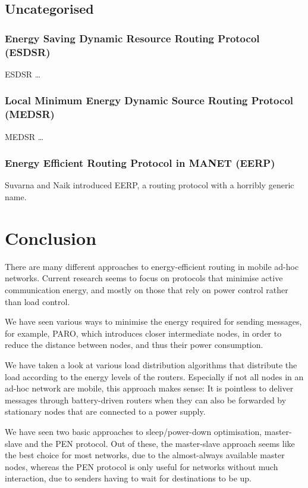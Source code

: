 \documentclass[conference]{IEEEtran}
\begin{document}
\subsection{Uncategorised}

\subsubsection{Energy Saving Dynamic Resource Routing Protocol (ESDSR)}
ESDSR\cite{tarique2005energy} \ldots{}

\subsubsection{Local Minimum Energy Dynamic Source Routing Protocol (MEDSR)}
MEDSR\cite{tanque2007minimum} \ldots{}

\subsubsection{Energy Efficient Routing Protocol in MANET (EERP)}
Suvarna and Naik introduced EERP, a routing protocol with a horribly
generic name\cite{main2}.

\section{Conclusion}
There are many different approaches to energy-efficient routing in
mobile ad-hoc networks. Current research seems to focus on protocols
that minimise active communication energy, and mostly on those that
rely on power control rather than load control.

We have seen various ways to minimise the energy required for sending
messages, for example, PARO, which introduces closer intermediate nodes,
in order to reduce the distance between nodes, and thus their
power consumption.

We have taken a look at various load distribution algorithms that distribute
the load according to the energy levels of the routers. Especially if not all
nodes in an ad-hoc network are mobile, this approach makes sense: It is
pointless to deliver messages through battery-driven routers when they can
also be forwarded by stationary nodes that are connected to a power supply.

We have seen two basic approaches to sleep/power-down optimisation, master-slave
and the PEN protocol. Out of these, the master-slave approach seems like the
best choice for most networks, due to the almost-always available master nodes,
whereas the PEN protocol is only useful for networks without much interaction,
due to senders having to wait for destinations to be up.





\end{document}
